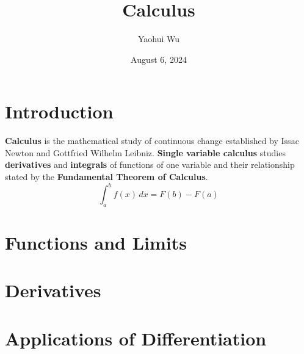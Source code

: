 \documentclass[12pt]{article}
\title{Calculus}
\author{Yaohui Wu}
\date{August 6, 2024}
\begin{document}
\maketitle

\section*{Introduction}

\textbf{Calculus} is the mathematical study of continuous change established
by Issac Newton and Gottfried Wilhelm Leibniz.
\textbf{Single variable calculus} studies \textbf{derivatives} and
\textbf{integrals} of functions of one variable and their relationship stated
by the \textbf{Fundamental Theorem of Calculus}.
\[\int_a^b f(x)\,dx=F(b)-F(a)\]

\tableofcontents
\newpage

\section{Functions and Limits}







\section{Derivatives}













\section{Applications of Differentiation}







\end{document}
